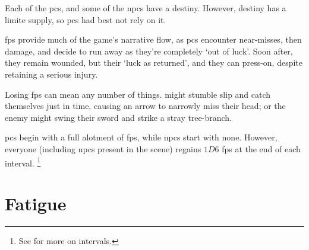 \begin{multicols}{2}

\noindent
Each of the \glspl{pc}, and some of the \glspl{npc} have a destiny.
However, destiny has a limite supply, so \glspl{pc} had best not rely on it.



\Glspl{fp} provide much of the game's narrative flow, as \glspl{pc} encounter near-misses, then damage, and decide to run away as they're completely `out of luck'.
Soon after, they remain wounded, but their `luck as returned', and they can press-on, despite retaining a serious injury.

Losing \glspl{fp} can mean any number of things.
 might stumble slip and catch themselves just in time, causing an arrow to narrowly miss their head; or the enemy might swing their sword and strike a stray tree-branch.

\Glspl{pc} begin with a full alotment of \glspl{fp}, while \glspl{npc} start with none.
However, everyone (including \glspl{npc} present in the scene) regains $1D6$ \glspl{fp} at the end of each \gls{interval}.%
\footnote{See  for more on \glspl{interval}.}

\end{multicols}

\section{Fatigue}

